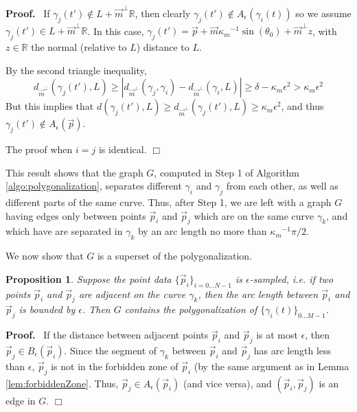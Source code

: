 \documentclass{article}
\newcommand{\nin}{\not\in}
\newtheorem{proposition}[cntr]{Proposition}
\newenvironment{proof}{
  \noindent\textbf{Proof.}\ }{\hspace*{\fill}
  \begin{math}\Box\end{math}\medskip}
\numberwithin{cntr}{section}
\numberwithin{equation}{section}
\newcommand{\abs}[1]{\left| #1 \right|}%
\newcommand{\RR}[0]{{\mathbb{R}}}
\newcommand{\vp}[0]{{\vec{p}}}
\newcommand{\vm}[0]{{\vec{m}}}
\newcommand{\Oto}[1]{{0 \ldots #1-1}}
\newcommand{\OtoN}{{0 \ldots N-1}}
\newcommand{\pointData}{{ \{ \vp_{i} \}_{i=\OtoN} }}
\newcommand{\curveSet}{{ \{ \gamma_i(t) \}_{\Oto{M}}}}
\newcommand{\ball}[2]{ { B_{#1}(#2) } }
\newcommand{\allowed}[2]{ { A_{#1}(#2) } }
\newcommand{\curvemax}{{\kappa_{m}}}
\newcommand{\curvemaxi}{{\curvemax^{-1}}}
\begin{document}
\begin{proof}
If $\gamma_{j}(t') \nin L+\vm^{\perp} \RR$, then clearly $\gamma_{j}(t') \nin \allowed{\epsilon}{\gamma_{i}(t)}$ so we assume $\gamma_{j}(t') \in L+\vm^{\perp} \RR$. In this case, $\gamma_{j}(t') = \vp + \vm \curvemaxi \sin(\theta_{0}) + \vm^\perp z$, with $z \in \RR$ the normal (relative to $L$) distance to $L$.

By the second triangle inequality,
\begin{equation*}
  d_{\vm^{\perp}}(\gamma_{j}(t'), L) \geq \abs{d_{\vm^{\perp}}(\gamma_{j}, \gamma_{i}) -  d_{\vm^{\perp}}(\gamma_{i}, L)}
  \geq \delta - \curvemax \epsilon^{2} > \curvemax \epsilon^{2}
\end{equation*}
But this implies that $d(\gamma_{j}(t'), L) \geq d_{\vm^{\perp}}(\gamma_{j}(t'), L) \geq \curvemax \epsilon^{2}$, and thus $\gamma_{j}(t') \nin \allowed{\epsilon}{\vp}$.

The proof when $i=j$ is identical.
\end{proof}

This result shows that the graph $G$, computed in Step 1 of Algorithm \ref{algo:polygonalization}, separates different $\gamma_{i}$ and $\gamma_{j}$ from each other, as well as different parts of the same curve. Thus, after Step 1, we are left with a graph $G$ having edges only between points $\vp_{i}$ and $\vp_{j}$ which are on the same curve $\gamma_{k}$, and which have are separated in $\gamma_{k}$ by an arc length no more than $\curvemaxi \pi/2$.

We now show that $G$ is a superset of the polygonalization.

\begin{proposition}
  Suppose the point data $\pointData$ is $\epsilon$-sampled, i.e. if two points $\vp_{i}$ and $\vp_{j}$ are adjacent on the curve $\gamma_{k}$, then the \emph{arc length} between $\vp_{i}$ and $\vp_{j}$ is bounded by $\epsilon$. Then $G$ contains the polygonalization of $\curveSet$.
\end{proposition}
\begin{proof}
  If the distance between adjacent points $\vp_{i}$ and $\vp_{j}$ is at most $\epsilon$, then $\vp_{j} \in \ball{\epsilon}{\vp_{i}}$. Since the segment of $\gamma_{k}$ between $\vp_{i}$ and $\vp_{j}$ has arc length less than $\epsilon$, $\vp_{j}$ is not in the forbidden zone of $\vp_{i}$ (by the same argument as in Lemma \ref{lem:forbiddenZone}. Thus, $\vp_{j} \in \allowed{\epsilon}{\vp_{i}}$ (and vice versa), and $(\vp_{i},\vp_{j})$ is an edge in $G$.
\end{proof}
\end{document}
